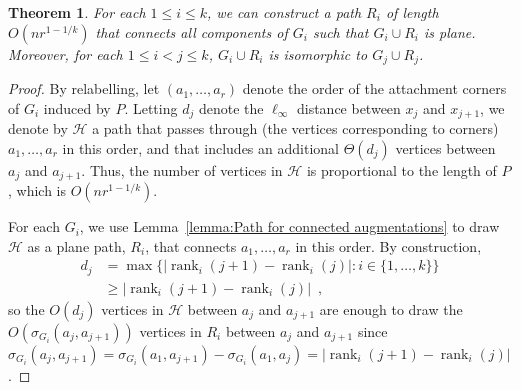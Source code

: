 \documentclass[11pt]{patmorin}
\newtheorem{theorem}{Theorem}[section]
\DeclareMathOperator{\rank}{rank}
\begin{document}
\begin{theorem}\label{theorem:main}
For each $1\leq i\leq k$, we can construct a path $R_i$ of length $O(nr^{1-1/k})$ that connects all components of $G_i$ such that $G_i\cup R_i$ is plane. Moreover, for each $1\leq i<j\leq k$, $G_i\cup R_i$ is isomorphic to $G_j\cup R_j$.
\end{theorem}
\begin{proof}
By relabelling, let $(a_1, \ldots, a_r)$ denote the order of the attachment corners of $G_i$ induced by $P$.  Letting $d_j$ denote the $\ell_\infty$ distance between $x_j$ and $x_{j+1}$, we denote by $\mathcal{H}$ a path that passes through (the vertices corresponding to corners) $a_1, \ldots, a_r$ in this order, and that includes an additional $\Theta(d_j)$ vertices between $a_{j}$ and $a_{j+1}$.  Thus, the number of vertices in $\mathcal{H}$ is proportional to the length of $P$, which is $O(nr^{1-1/k})$.

For each $G_i$, we use Lemma~\ref{lemma:Path for connected augmentations}
to draw $\mathcal{H}$ as a plane path, $R_i$, that connects $a_1,
\ldots, a_r$ in this order. By construction, 
\begin{align*}
  d_j & = \max\{|\rank_i(j+1) - \rank_i(j)|: i\in\{1,\ldots,k\}\} \\
    & \ge |\rank_i(j+1) - \rank_i(j)| \enspace ,
\end{align*}
so the $O(d_j)$ vertices in $\mathcal{H}$
between $a_j$ and $a_{j+1}$ are enough to draw the 
$O(\sigma_{G_i}(a_j,a_{j+1}))$ vertices in $R_i$ between $a_j$ and
$a_{j+1}$ since $\sigma_{G_i}(a_j,a_{j+1}) = \sigma_{G_i}(a_1,a_{j+1})-\sigma_{G_i}(a_1,a_{j}) = |\rank_i(j+1) - \rank_i(j)|$.




\end{proof}
\end{document}
